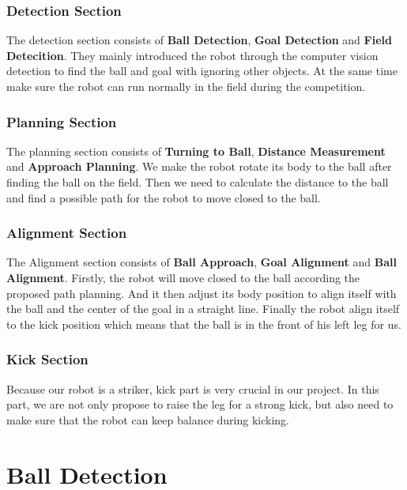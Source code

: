 \subsubsection*{Detection Section} 
The detection section consists of \textbf{Ball Detection}, \textbf{Goal Detection} and \textbf{Field Detecition}. They mainly introduced the robot through the computer vision detection to find the ball and goal with ignoring other objects. At the same time make sure the robot can run normally in the field during the competition. \\

\subsubsection*{Planning Section} 
The planning section consists of \textbf{Turning to Ball}, \textbf{Distance Measurement} and \textbf{Approach Planning}. We make the robot rotate its body to the ball after finding the ball on the field. Then we need to calculate the distance to the ball and find a possible path for the robot to move closed to the ball.\\


\subsubsection*{Alignment Section}
The Alignment section consists of \textbf{Ball Approach}, \textbf{Goal Alignment} and \textbf{Ball Alignment}. Firstly, the robot will move closed to the ball according the proposed path planning. And it then adjust its body position to align itself with the ball and the center of the goal in a straight line. Finally the robot align itself to the kick position which means that the ball is in the front of his left leg for us.\\

\subsubsection*{Kick Section}
Because our robot is a striker, kick part is very crucial in our project. In this part, we are not only propose to raise the leg for a strong kick, but also need to make sure that the robot can keep balance during kicking.\\




\section{Ball Detection}

